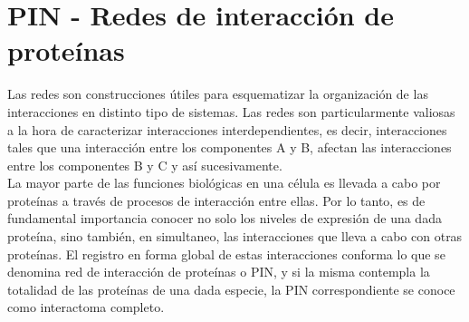 \section{PIN - Redes de interacción de proteínas}
\label{sec:redes}
Las redes son construcciones útiles para esquematizar la organización de las interacciones en distinto tipo de sistemas. Las redes son particularmente valiosas a la hora de caracterizar interacciones interdependientes, es decir, interacciones tales que una interacción entre los componentes A y B, afectan las interacciones entre los componentes B y C y así sucesivamente.\\
La mayor parte de las funciones biológicas en una célula es llevada a cabo por proteínas a través de procesos de interacción entre ellas. Por lo tanto, es de fundamental importancia conocer no solo los niveles de expresión de una dada proteína, sino también, en simultaneo, las interacciones que lleva a cabo con otras proteínas. El registro en forma global de estas interacciones conforma lo que se denomina red de interacción de proteínas o PIN, y si la misma contempla la totalidad de las proteínas de una dada especie, la PIN correspondiente se conoce como interactoma completo.\\

